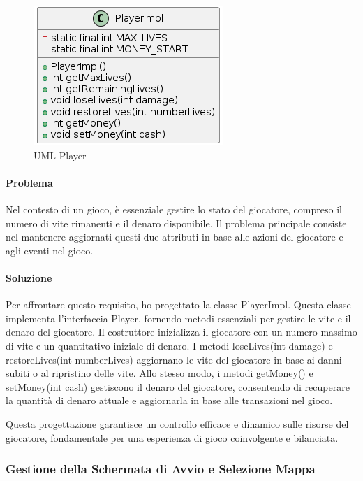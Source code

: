 \documentclass[a4paper,12pt]{report}
\begin{document}
\begin{figure}[H]
    \centering
    \includegraphics[scale=1.2]{Player}
    \caption{UML Player}
    \label{fig:player}
\end{figure}


\paragraph{Problema} Nel contesto di un gioco, è essenziale gestire lo stato del giocatore, compreso il numero di vite rimanenti e il denaro disponibile. Il problema principale consiste nel mantenere aggiornati questi due attributi in base alle azioni del giocatore e agli eventi nel gioco.
\paragraph{Soluzione} Per affrontare questo requisito, ho progettato la classe PlayerImpl. Questa classe implementa l'interfaccia Player, fornendo metodi essenziali per gestire le vite e il denaro del giocatore. Il costruttore inizializza il giocatore con un numero massimo di vite e un quantitativo iniziale di denaro. I metodi loseLives(int damage) e restoreLives(int numberLives) aggiornano le vite del giocatore in base ai danni subiti o al ripristino delle vite. Allo stesso modo, i metodi getMoney() e setMoney(int cash) gestiscono il denaro del giocatore, consentendo di recuperare la quantità di denaro attuale e aggiornarla in base alle transazioni nel gioco.

Questa progettazione garantisce un controllo efficace e dinamico sulle risorse del giocatore, fondamentale per una esperienza di gioco coinvolgente e bilanciata.

\subsubsection{Gestione della Schermata di Avvio e Selezione Mappa}
\end{document}
